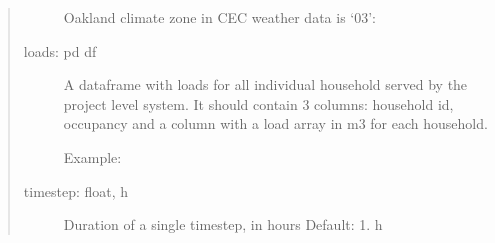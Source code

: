 \documentclass[letterpaper,10pt,english,openany]{sphinxmanual}
\begin{document}
\begin{fulllineitems}
\begin{quote}
\begin{description}
Oakland climate zone in CEC weather data is ‘03’:

\begin{sphinxVerbatim}[commandchars=\\\{\}]
   
\end{sphinxVerbatim}

\item[{loads: pd df}] \leavevmode
A dataframe with loads for all individual household
served by the project level system. It should
contain 3 columns: household id, occupancy and a column
with a load array in m3 for each household.

Example:

\begin{sphinxVerbatim}[commandchars=\\\{\}]
    \PYG{p}{[}\PYG{p}{[}      \PYG{p}{]}\PYG{p}{[}    \PYG{p}{]}\PYG{p}{[}    \PYG{p}{]}\PYG{p}{[}      \PYG{p}{]}\PYG{p}{]}                      \PYG{p}{[}\PYG{p}{[}\PYG{p}{]} \PYG{p}{[}\PYG{p}{]} \PYG{p}{[}\PYG{p}{]}\PYG{p}{]}
\end{sphinxVerbatim}

\item[{timestep: float, h}] \leavevmode
Duration of a single timestep, in hours
Default: 1. h


\end{description}
\end{quote}
\end{fulllineitems}
\end{document}
